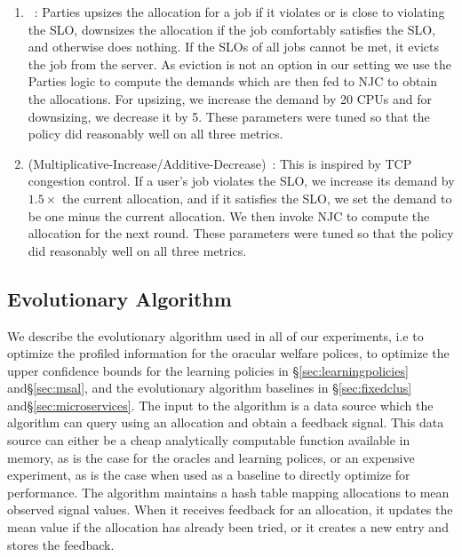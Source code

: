 \begin{enumerate}[label=\arabic*)]
\item \parties~\cite{chen2019parties}: 
Parties upsizes the allocation for a job
if it violates or is close to violating the SLO, downsizes the allocation if the job comfortably
satisfies the SLO, and otherwise does nothing.
If the SLOs of all jobs cannot be met, it evicts the job from the server.
As eviction is not an option in our setting %
we use the Parties logic to compute the demands which are then fed to NJC to obtain the allocations.
For upsizing, we increase the demand by 20 CPUs and for downsizing, we decrease it by 5.
These parameters were tuned so that the policy did reasonably well on all three metrics.

\item \AIMD{} (Multiplicative-Increase/Additive-Decrease)~\cite{chiu1989analysis}: 
This is inspired by TCP congestion control.
If a user's job violates the SLO, we increase its demand by $1.5\times$ the current allocation,
and if it satisfies the SLO, we set the demand to be one minus the current allocation.
We then invoke NJC to compute the allocation for the next round.
These parameters were tuned so that the policy did reasonably well on all three metrics.
\end{enumerate}




\subsection{Evolutionary Algorithm}
We describe the evolutionary algorithm used in all of our experiments,
i.e to optimize the profiled information for the oracular welfare polices, to optimize the upper
confidence bounds for the learning policies in \S\ref{sec:learningpolicies} and\S\ref{sec:msal},
and the evolutionary algorithm baselines in \S\ref{sec:fixedclus} and\S\ref{sec:microservices}.
The input to the algorithm is a data source which the algorithm can query using an allocation and
obtain a feedback signal.
This data source can either be
a cheap analytically computable function
available in memory, as is the case for the oracles and learning polices,
or an expensive experiment, as is the case when used as a baseline to directly optimize for
performance.
The algorithm maintains a hash table mapping allocations to mean observed signal values.
When it receives feedback for an allocation, it updates the mean value if the allocation has already
been tried, or it creates a new entry and stores the feedback.

